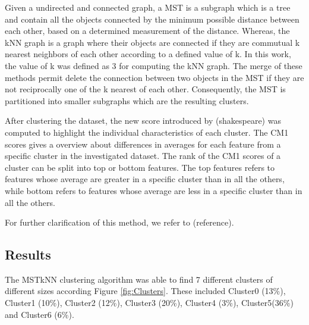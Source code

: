 \documentclass{article}
\begin{document}
Given a undirected and connected graph, a MST is a subgraph which is a tree and
contain all the objects connected by the minimum possible distance between each
other, based on a determined measurement of the distance. Whereas, the kNN graph
is a graph where their objects are connected if they are commutual k nearest
neighbors of each other according to a defined value of k. In this work, the
value of k was defined as 3 for computing the kNN graph. The merge of these
methods permit delete the connection between two objects in the MST if they are
not reciprocally one of the k nearest of each other. Consequently, the MST is
partitioned into smaller subgraphs which are the resulting clusters.


After clustering the dataset, the new score introduced by (shakespeare) was
computed to highlight the individual characteristics of each cluster. The CM1
scores gives a overview about differences in averages for each feature from a
specific cluster in the investigated dataset. The rank of the CM1 scores of a
cluster can be split into top or bottom features. The top features refers to
features whose average are greater in a specific cluster than in all the others,
while bottom refers to features whose average are less in a specific cluster
than in all the others.






For further clarification of this method, we refer to (reference). 


\subsection{Results}

The MSTkNN clustering algorithm was able to find 7 different clusters of
different sizes according Figure \ref{fig:Clusters}. These included Cluster0
(13\%), Cluster1 (10\%), Cluster2 (12\%), Cluster3 (20\%), Cluster4 (3\%),
Cluster5(36\%) and Cluster6 (6\%).
\end{document}
